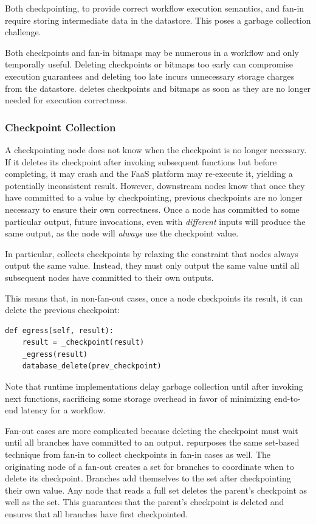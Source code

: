 Both checkpointing, to provide correct workflow execution semantics, and fan-in
require storing intermediate data in the datastore. This poses a garbage
collection challenge.

Both checkpoints and fan-in bitmaps may be numerous in a workflow and only
temporally useful. Deleting checkpoints or bitmaps too early can compromise
execution guarantees and deleting too late incurs unnecessary storage charges
from the datastore. \name{} deletes checkpoints and bitmaps as soon as they are
no longer needed for execution correctness.

\subsubsection{Checkpoint Collection}

A checkpointing node does not know when the checkpoint is no longer necessary.
If it deletes its checkpoint after invoking subsequent functions but before
completing, it may crash and the FaaS platform may re-execute it, yielding a
potentially inconsistent result. However, downstream nodes know that once they
have committed to a value by checkpointing, previous checkpoints are no longer
necessary to ensure their own correctness. Once a node has committed to some
particular output, future invocations, even with \emph{different} inputs will produce the same output, as the node will \emph{always} use the checkpoint value.

In particular, \name{} collects checkpoints by relaxing the constraint that
nodes always output the same value. Instead, they must only output the same
value until all subsequent nodes have committed to their own outputs.

This means that, in non-fan-out cases, once a node checkpoints its result, it
can delete the previous checkpoint:

\begin{verbatim}
def egress(self, result):
    result = _checkpoint(result)
    _egress(result)
    database_delete(prev_checkpoint)
\end{verbatim}

Note that \name{} runtime implementations delay garbage collection until after
invoking next functions, sacrificing some storage overhead in favor of
minimizing end-to-end latency for a workflow.

Fan-out cases are more complicated because deleting the checkpoint must wait
until all branches have committed to an output. \name{} repurposes the same
set-based technique from fan-in to collect checkpoints in fan-in cases as well.
The originating node of a fan-out creates a set for branches to coordinate when
to delete its checkpoint. Branches add themselves to the set after checkpointing
their own value. Any node that reads a full set deletes the parent's checkpoint
as well as the set. This guarantees that the parent's checkpoint is deleted and
ensures that all branches have first checkpointed.

